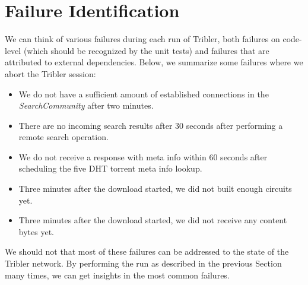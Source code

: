 \section{Failure Identification}
We can think of various failures during each run of Tribler, both failures on code-level (which should be recognized by the unit tests) and failures that are attributed to external dependencies. Below, we summarize some failures where we abort the Tribler session:
\begin{itemize}
	\item We do not have a sufficient amount of established connections in the \emph{SearchCommunity} after two minutes.
	\item There are no incoming search results after 30 seconds after performing a remote search operation.
	\item We do not receive a response with meta info within 60 seconds after scheduling the five DHT torrent meta info lookup.
	\item Three minutes after the download started, we did not built enough circuits yet.
	\item Three minutes after the download started, we did not receive any content bytes yet.
\end{itemize}
We should not that most of these failures can be addressed to the state of the Tribler network. By performing the run as described in the previous Section many times, we can get insights in the most common failures.



